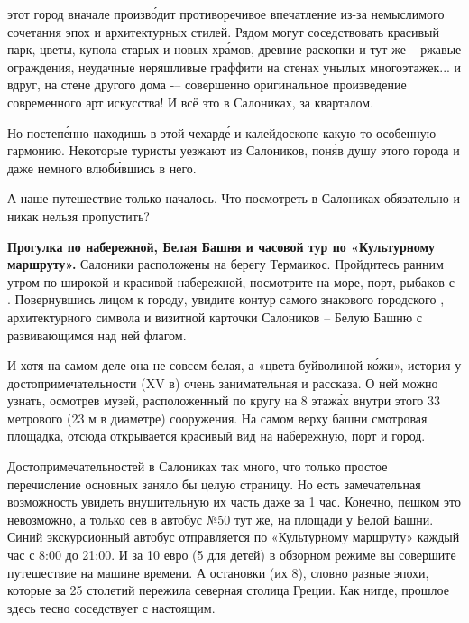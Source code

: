  этот город вначале произв\'{о}дит противоречивое впечатление из-за немыслимого сочетания эпох и архитектурных стилей. Рядом могут соседствовать красивый парк, цветы, купола старых и новых хр\'{а}мов, древние раскопки и тут же -- ржавые ограждения, неудачные неряшливые граффити на стенах унылых многоэтажек... и вдруг, на стене другого дома -– совершенно оригинальное произведение современного арт искусства! И всё это  в Салониках,  за кварталом.

Но постеп\'{е}нно находишь в этой чехард\'{е} и калейдоскопе какую-то особенную гармонию. Некоторые туристы уезжают из Салоников, пон\'{я}в душу этого города и даже немного влюб\'{и}вшись в него.

А наше путешествие только началось. Что посмотреть в Салониках обязательно и никак нельзя пропустить?

\textbf{Прогулка по набережной, Белая Башня и часовой тур по «Культурному маршруту».}
Салоники расположены на берегу  Термаикос. Пройдитесь ранним утром по широкой и красивой набережной, посмотрите на море, порт, рыбаков с . Повернувшись лицом к городу, увидите контур самого знакового городского , архитектурного символа и визитной карточки Салоников – Белую Башню с развивающимся над ней флагом.

И хотя на самом деле она не совсем белая, а «цвета буйволиной к\'{о}жи», история у достопримечательности (XV в) очень занимательная и   рассказа. О ней можно узнать, осмотрев музей, расположенный по кругу на 8 этаж\'{а}х внутри этого 33 метрового (23 м в диаметре)  сооружения. На самом верху башни смотровая площадка, отсюда открывается красивый вид на набережную, порт и город.

Достопримечательностей в Салониках так много, что только простое перечисление основных заняло бы целую страницу. Но есть замечательная возможность увидеть внушительную их часть даже за 1 час. Конечно, пешком это невозможно, а только сев в автобус №50 тут же, на площади у Белой Башни. Синий экскурсионный автобус отправляется по «Культурному маршруту» каждый час с 8:00 до 21:00. И за 10 евро (5 для детей) в обзорном режиме вы совершите путешествие на машине времени. А остановки (их 8), словно разные эпохи, которые за 25 столетий пережила северная столица Греции. Как нигде, прошлое здесь тесно соседствует с настоящим.

